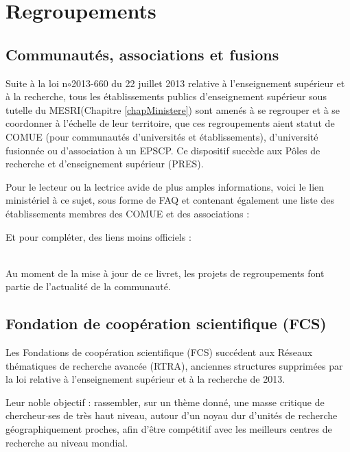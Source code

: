 \section{Regroupements}
\label{Regroupements}
\subsection{Communaut\'es, associations et fusions}
Suite \`a la loi n$\circ$2013-660 du 22 juillet 2013 relative \`a  l'enseignement sup\'erieur et \`a la recherche,
tous les \'etablissements publics d'enseignement sup\'erieur sous tutelle du MESRI(Chapitre \ref{chapMinistere}) sont amen\'es \`a  se regrouper et \`a se coordonner \`a l'\'echelle de leur territoire, que ces regroupements aient statut de COMUE (pour communaut\'es d'universit\'es et \'etablissements), d'universit\'e fusionn\'ee ou d'association \`a  un EPSCP.
Ce dispositif succ\`ede aux P\^oles de recherche et d'enseignement sup\'erieur (PRES). 

Pour le lecteur ou la lectrice avide de plus amples informations, voici le lien minist\'eriel  \`a ce sujet, 
sous forme de FAQ et contenant \'egalement  une liste des \'etablissements membres des COMUE et des associations : \\

Et pour compl\'eter, des liens moins officiels : \\
 \\

Au moment de la mise \`a jour de ce livret, les projets de regroupements font partie de l'actualit\'e de la communaut\'e.

\subsection{Fondation de coop\'eration scientifique (FCS)}

Les Fondations de coop\'eration scientifique (FCS) succ\'edent aux R\'eseaux th\'ematiques de recherche avanc\'ee (RTRA), anciennes structures supprim\'ees par la loi relative \`a l'enseignement sup\'erieur et \`a la recherche de 2013.

Leur noble objectif : rassembler, sur un th\`eme donn\'e, une masse critique de chercheur$\cdot$ses de tr\`es haut niveau, autour d'un noyau dur d'unit\'es de recherche g\'eographiquement proches, afin d'\^etre comp\'etitif avec les meilleurs centres de recherche au niveau mondial.

